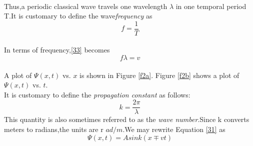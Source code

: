 \documentclass[12pt]{article}
\numberwithin{equation}{section}
\begin{document}
    \\
    Thus,a periodic classical wave travels one wavelength $\lambda$ in one temporal period T.It is customary to define the wave\emph{frequency} as 
    \\
    \begin{equation}
        f=\frac{1}{T}\label{34}
    \end{equation}
    \\
    In terms of frequency,\eqref{33} becomes
    \begin{equation}
        f\lambda=v\label{35}
    \end{equation}
    \\
    A plot of $\Psi(x,t)$ vs. $x$ is shown in Figure \ref{f2a}. Figure \ref{f2b} shows a plot of $\Psi(x,t)$ vs. $t$.\\
    It is customary to define the \emph{propagation constant} as follows:
    \begin{equation}
        k=\frac{2\pi}{\lambda}\label{36}
    \end{equation}
    This quantity is also sometimes referred to as the \emph{wave number}.Since k converts meters to radians,the units are r $ad/m$.We may rewrite Equation \eqref{31} as 
    \[
        \Psi(x,t)=Asink(x\mp vt)
    \]
    \newpage
\end{document}
